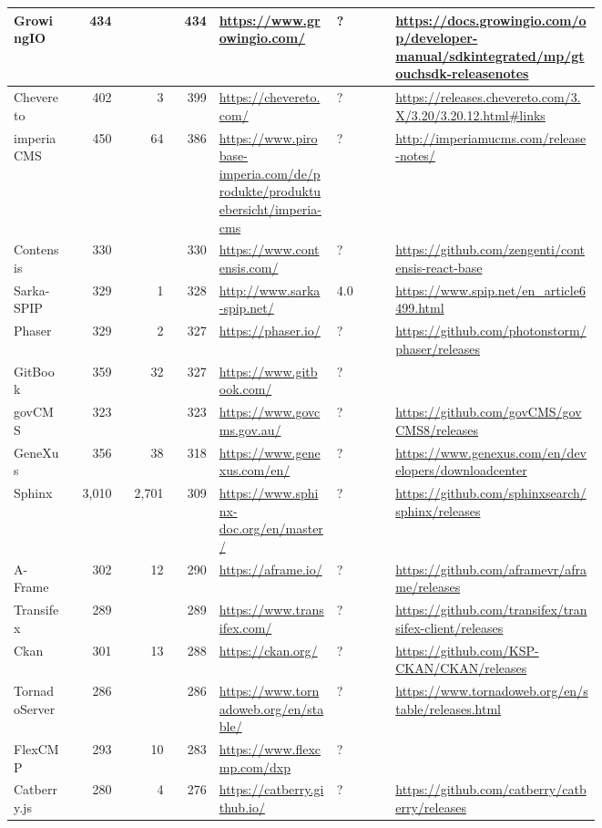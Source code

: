 \begin{landscape}
\begin{longtable}{|p{0.1\linewidth}|r|r|r|p{0.2\linewidth}|p{0.1\linewidth}|p{0.35\linewidth}|}
		GrowingIO &434 & &434 &\url{https://www.growingio.com/} &? &\url{https://docs.growingio.com/op/developer-manual/sdkintegrated/mp/gtouchsdk-releasenotes} \\\hline
		Chevereto &402 &3 &399 &\url{https://chevereto.com/} &? &\url{https://releases.chevereto.com/3.X/3.20/3.20.12.html\#links} \\\hline
		imperia CMS &450 &64 &386 &\url{https://www.pirobase-imperia.com/de/produkte/produktuebersicht/imperia-cms} &? &\url{http://imperiamucms.com/release-notes/} \\\hline
		Contensis &330 & &330 &\url{https://www.contensis.com/} &? &\url{https://github.com/zengenti/contensis-react-base} \\\hline
		Sarka-SPIP &329 &1 &328 &\url{http://www.sarka-spip.net/} &4.0 &\url{https://www.spip.net/en\_article6499.html} \\\hline
		Phaser &329 &2 &327 &\url{https://phaser.io/} &? &\url{https://github.com/photonstorm/phaser/releases} \\\hline
		GitBook &359 &32 &327 &\url{https://www.gitbook.com/} &? & \\\hline
		govCMS &323 & &323 &\url{https://www.govcms.gov.au/} &? &\url{https://github.com/govCMS/govCMS8/releases} \\\hline
		GeneXus &356 &38 &318 &\url{https://www.genexus.com/en/} &? &\url{https://www.genexus.com/en/developers/downloadcenter} \\\hline
		Sphinx &3,010 &2,701 &309 &\url{https://www.sphinx-doc.org/en/master/} &? &\url{https://github.com/sphinxsearch/sphinx/releases} \\\hline
		A-Frame &302 &12 &290 &\url{https://aframe.io/} &? &\url{https://github.com/aframevr/aframe/releases} \\\hline
		Transifex &289 & &289 &\url{https://www.transifex.com/} &? &\url{https://github.com/transifex/transifex-client/releases} \\\hline
		Ckan &301 &13 &288 &\url{https://ckan.org/} &? &\url{https://github.com/KSP-CKAN/CKAN/releases} \\\hline
		TornadoServer &286 & &286 &\url{https://www.tornadoweb.org/en/stable/} &? &\url{https://www.tornadoweb.org/en/stable/releases.html} \\\hline
		FlexCMP &293 &10 &283 &\url{https://www.flexcmp.com/dxp} &? & \\\hline
		Catberry.js &280 &4 &276 &\url{https://catberry.github.io/} &? &\url{https://github.com/catberry/catberry/releases} \\\hline

\end{longtable}
\end{landscape}
